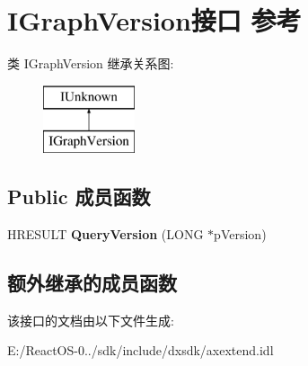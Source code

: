 \hypertarget{interface_i_graph_version}{}\section{I\+Graph\+Version接口 参考}
\label{interface_i_graph_version}
类 I\+Graph\+Version 继承关系图\+:\begin{figure}[H]
\begin{center}
\leavevmode
\includegraphics[height=2.000000cm]{interface_i_graph_version}
\end{center}
\end{figure}
\subsection*{Public 成员函数}
\begin{DoxyCompactItemize}
\item 
\mbox{\label{interface_i_graph_version_aeacfe2d26e48aa411c5223fe1b9d3a36}} 
H\+R\+E\+S\+U\+LT {\bfseries Query\+Version} (L\+O\+NG $\ast$p\+Version)
\end{DoxyCompactItemize}
\subsection*{额外继承的成员函数}


该接口的文档由以下文件生成\+:\begin{DoxyCompactItemize}
\item 
E\+:/\+React\+O\+S-\/0../sdk/include/dxsdk/axextend.\+idl\end{DoxyCompactItemize}
